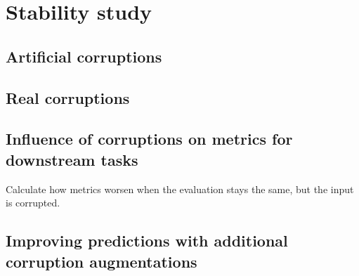 \section{Stability study}
    \subsection{Artificial corruptions}
        
    \subsection{Real corruptions}
        
    \subsection{Influence of corruptions on metrics for downstream tasks}
        Calculate how metrics worsen when the evaluation stays the same, but the input is corrupted.
    \subsection{Improving predictions with additional corruption augmentations}
        